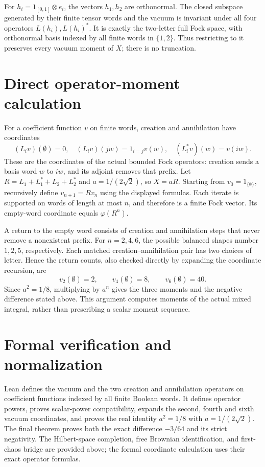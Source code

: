 \documentclass[11pt]{article}
\begin{document}
For $h_i=1_{[0,1]}\otimes e_i$, the vectors $h_1,h_2$ are orthonormal. The closed subspace generated by their finite tensor words and the vacuum is invariant under all four operators $L(h_i),L(h_i)^*$. It is exactly the two-letter full Fock space, with orthonormal basis indexed by all finite words in $\{1,2\}$. Thus restricting to it preserves every vacuum moment of $X$; there is no truncation.
\section*{Direct operator-moment calculation}
For a coefficient function $v$ on finite words, creation and annihilation have coordinates
\[
 (L_i v)(\emptyset)=0,\quad
 (L_i v)(j w)=1_{i=j}v(w),\quad
 (L_i^*v)(w)=v(iw).
\]
These are the coordinates of the actual bounded Fock operators: creation sends a basis word $w$ to $iw$, and its adjoint removes that prefix. Let
$R=L_1+L_1^*+L_2+L_2^*$ and $a=1/(2\sqrt2)$, so $X=aR$.
Starting from $v_0=1_{\{\emptyset\}}$, recursively define $v_{n+1}=Rv_n$ using the displayed formulas. Each iterate is supported on words of length at most $n$, and therefore is a finite Fock vector. Its empty-word coordinate equals $\varphi(R^n)$.

A return to the empty word consists of creation and annihilation steps that never remove a nonexistent prefix. For $n=2,4,6$, the possible balanced shapes number $1,2,5$, respectively. Each matched creation--annihilation pair has two choices of letter. Hence the return counts, also checked directly by expanding the coordinate recursion, are
\[
 v_2(\emptyset)=2,\qquad v_4(\emptyset)=8,\qquad
 v_6(\emptyset)=40.
\]
Since $a^2=1/8$, multiplying by $a^n$ gives the three moments and the negative difference stated above. This argument computes moments of the actual mixed integral, rather than prescribing a scalar moment sequence.
\section*{Formal verification and normalization}
Lean defines the vacuum and the two creation and annihilation operators on coefficient functions indexed by all finite Boolean words. It defines operator powers, proves scalar-power compatibility, expands the second, fourth and sixth vacuum coordinates, and proves the real identity $a^2=1/8$ with $a=1/(2\sqrt2)$. The final theorem proves both the exact difference $-3/64$ and its strict negativity. The Hilbert-space completion, free Brownian identification, and first-chaos bridge are provided above; the formal coordinate calculation uses their exact operator formulas.
\end{document}
